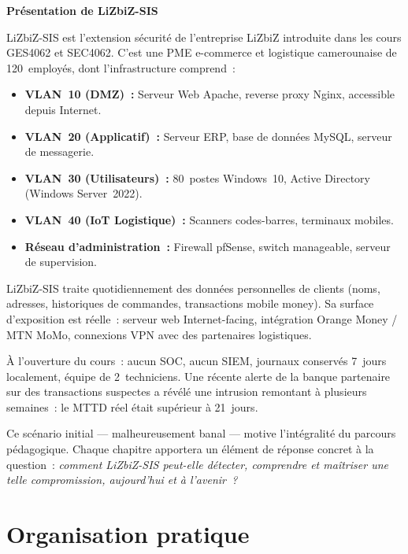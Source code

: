 \begin{boxlizbiz}
\textbf{Présentation de LiZbiZ-SIS}

LiZbiZ-SIS est l'extension sécurité de l'entreprise LiZbiZ introduite dans
les cours GES4062 et SEC4062. C'est une PME e-commerce et logistique
camerounaise de 120~employés, dont l'infrastructure comprend~:

\begin{itemize}
  \item \textbf{VLAN~10 (DMZ)~:} Serveur Web Apache, reverse proxy Nginx,
        accessible depuis Internet.
  \item \textbf{VLAN~20 (Applicatif)~:} Serveur ERP, base de données MySQL,
        serveur de messagerie.
  \item \textbf{VLAN~30 (Utilisateurs)~:} 80~postes Windows~10,
        Active Directory (Windows Server~2022).
  \item \textbf{VLAN~40 (IoT Logistique)~:} Scanners codes-barres,
        terminaux mobiles.
  \item \textbf{Réseau d'administration~:} Firewall pfSense, switch manageable,
        serveur de supervision.
\end{itemize}

LiZbiZ-SIS traite quotidiennement des données personnelles de clients
(noms, adresses, historiques de commandes, transactions mobile money).
Sa surface d'exposition est réelle~: serveur web Internet-facing,
intégration Orange Money / MTN MoMo, connexions VPN avec des partenaires
logistiques.

À l'ouverture du cours~: aucun SOC, aucun SIEM, journaux conservés
7~jours localement, équipe de 2~techniciens. Une récente alerte de la
banque partenaire sur des transactions suspectes a révélé une intrusion
remontant à plusieurs semaines~: le MTTD réel était supérieur à 21~jours.
\end{boxlizbiz}

Ce scénario initial — malheureusement banal — motive l'intégralité du
parcours pédagogique. Chaque chapitre apportera un élément de réponse
concret à la question~: \textit{comment LiZbiZ-SIS peut-elle détecter,
comprendre et maîtriser une telle compromission, aujourd'hui et à l'avenir~?}

\section*{Organisation pratique}

